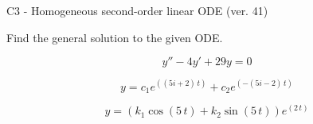 \begin{exercise}
  \begin{exerciseTitle}C3 - Homogeneous second-order linear ODE (ver. 41)\end{exerciseTitle}
  \begin{exerciseStatement}
    
Find the general solution to the given ODE.

    
\[y''-4y'+29y = 0\]

  \end{exerciseStatement}
  \begin{exerciseAnswer}
    
\[y= c_{1} e^{\left(\left(5 i + 2\right) \, t\right)} + c_{2} e^{\left(-\left(5 i - 2\right) \, t\right)}\]

    
\[y= {\left(k_{1} \cos\left(5 \, t\right) + k_{2} \sin\left(5 \, t\right)\right)} e^{\left(2 \, t\right)}\]

  \end{exerciseAnswer}
\end{exercise}